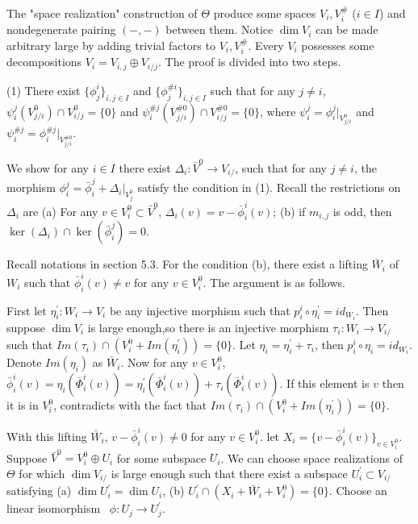 \def\CTEXPreproc{Created by ctex v0.2.12, don't edit!}\documentclass[11pt]{article}
\begin{document}
\begin{pf} The "space realization" construction of $\Theta$ produce some spaces $V_i , V^{\#}_i$ ($i\in I$) and nondegenerate pairing $(-,-)$ between them. Notice $\dim V_i $ can be made arbitrary large by adding trivial factors to $V_i , V^{\#}_i $. Every $V_i$ possesses
some decompositions $V_i = V_{i,j}\oplus V_{i/j}$.  The proof is divided into two steps.

(1) There exist  $\{  \phi^i _j \}_{i,j \in I}$ and $\{  \phi^{\# i} _j \}_{i,j \in I}$  such that  for any $j\neq i$,  $\psi^j _i ( V^0 _{j/i} ) \cap V^0 _{i/j}= \{ 0 \} $
and  $\psi^{\# j} _i ( V^{\# 0} _{j/i} ) \cap V^{\# 0} _{i/j}= \{ 0 \} $, where $\psi^j _i = \phi ^j _i |_{ V^0 _{j/i} }$ and
$\psi^{\# j} _i = \phi ^{\# j} _i |_{ V^{\# 0} _{j/i} }$.

We show for any $i\in I$ there exist $\Delta_i : \bar{V}^0 \rightarrow V_{i/}$, such that for any $j\neq i$, the morphism
$\phi^j _i = \bar{\phi}^j _i + \Delta_i |_{V^0 _j} $ satisfy the condition in (1). Recall the restrictions on $\Delta_i$ are
(a) For any $v\in V^0 _i \subset \bar{V}^0 $, $\Delta_i (v) = v- \bar{\phi}^i _i (v) $; (b) if $m_{i,j}$ is odd, then
$\ker ( \Delta_i   ) \cap \ker ( \bar{\phi}^j _i  )=0 $.

Recall notations in section 5.3.  For the condition (b), there exist a lifting $ \bar{W}_i $ of $W_i $ such that $\bar{\phi}^i _i (v)\neq v$ for any $v\in V^0 _i$. The argument is as follows.

First let $\eta^{'}_i : W_i \rightarrow V_i $ be any injective morphism such that $p^i _i \circ \eta^{'}_i = id_{W_i }$. Then suppose $\dim V_i$ is large enough,so there is an injective morphism $\tau_i : W_i \rightarrow V_{i/}$ such that
$Im(\tau_i) \cap ( V^0 _i + Im ( \eta^{'}_i )   )= \{ 0 \}$. Let $\eta_i = \eta^{'}_i + \tau_i $, then $p^i _i \circ \eta_i =id_{W_i} $. Denote $Im (\eta_i)$ as $\bar{W}_i$. Now for any $v\in V^0 _i$,
$\bar{\phi}^i _i ( v )= \eta_i ( \bar{\Phi}^i _i (v)    )= \eta^{'}_i (\bar{\Phi}^i _i (v)   ) + \tau_i (\bar{\Phi}^i _i (v)    ) $. If this element is $v$ then it is in $V^0 _i$, contradicts with the fact that $Im(\tau_i) \cap ( V^0 _i + Im ( \eta^{'}_i )   )= \{ 0 \}$.

With this lifting $\bar{W}_i$, $v-\bar{\phi}^i _i (v)\neq 0 $ for any $v\in V^0 _i$. let $X_i = \{ v-\bar{\phi}^i _i (v) \}_{ v\in V^0 _i }   $.
Suppose $\bar{V}^0 = V^0 _i \oplus U_i $ for some subspace $U_i$.  We can choose space realizations of $\Theta$ for which $\dim V_{i/}$  is large enough such that there exist a subspace $U^{'}_i \subset V_{i/}$ satisfying  (a) $\dim U^{'}_i =\dim U_i $,  (b) $U^{'}_i \cap ( X_i + \bar{W}_i + V^0 _i ) =\{ 0 \}$.  Choose an linear isomorphism \
$\phi: U_j \rightarrow U^{'}_j$.


\end{pf}
\end{document}
